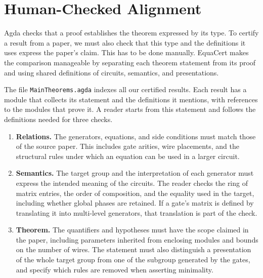 \documentclass[acmsmall,screen,nonacm]{acmart}
\begin{document}
\section{Human-Checked Alignment}\label{sec:alignment}

Agda checks that a proof establishes the theorem expressed by its
type. To certify a result from a paper, we must also check that this
type and the definitions it uses express the paper's claim. 
This has to be done manually. EquaCert makes the
comparison manageable by separating each theorem statement from its
proof and using shared definitions of circuits, semantics, and
presentations.


The file \texttt{MainTheorems.agda} indexes all our certified results. 
Each result has a  module that collects its statement and the
definitions it mentions, with references to the modules that prove
it. A reader starts from this statement and follows the definitions
needed for three checks.

\begin{enumerate}
\item \textbf{Relations.} The generators, equations, and side
  conditions must match those of the source paper. This includes
  gate arities, wire placements, and the structural rules under
  which an equation can be used in a larger circuit.
\item \textbf{Semantics.} The target group and the interpretation of
  each generator must express the intended meaning of the circuits.
  The reader checks the ring of matrix entries, the order of
  composition, and the equality used in the target, including whether
  global phases are retained. If a gate's matrix is defined by
  translating it into multi-level generators, that translation is
  part of the check.
\item \textbf{Theorem.} The quantifiers and hypotheses must have the
  scope claimed in the paper, including parameters inherited from
  enclosing modules and bounds on the number of wires. The statement
  must also distinguish a presentation of the whole target group
  from one of the subgroup generated by the gates, and specify which
  rules are removed when asserting minimality.
\end{enumerate}
\end{document}
